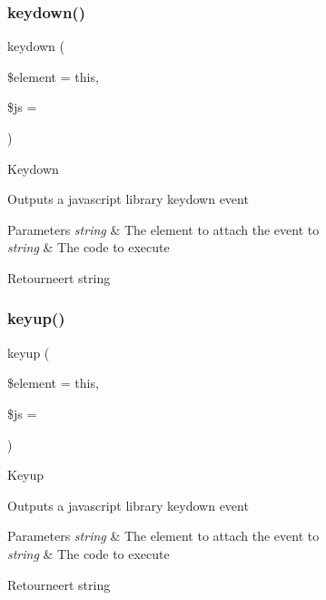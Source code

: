 \subsubsection{\texorpdfstring{keydown()}{keydown()}}
{\footnotesize\ttfamily keydown (\begin{DoxyParamCaption}\item[{}]{\$element = {\ttfamily \textquotesingle{}this\textquotesingle{}},  }\item[{}]{\$js = {\ttfamily \textquotesingle{}\textquotesingle{}} }\end{DoxyParamCaption})}

Keydown

Outputs a javascript library keydown event


\begin{DoxyParams}{Parameters}
{\em string} & The element to attach the event to \\
\hline
{\em string} & The code to execute \\
\hline
\end{DoxyParams}
\begin{DoxyReturn}{Retourneert}
string 
\end{DoxyReturn}
\mbox{\label{class_c_i___javascript_a8c6e3a3b521c059cfd6799b3dc73d0d6}} 
\subsubsection{\texorpdfstring{keyup()}{keyup()}}
{\footnotesize\ttfamily keyup (\begin{DoxyParamCaption}\item[{}]{\$element = {\ttfamily \textquotesingle{}this\textquotesingle{}},  }\item[{}]{\$js = {\ttfamily \textquotesingle{}\textquotesingle{}} }\end{DoxyParamCaption})}

Keyup

Outputs a javascript library keydown event


\begin{DoxyParams}{Parameters}
{\em string} & The element to attach the event to \\
\hline
{\em string} & The code to execute \\
\hline
\end{DoxyParams}
\begin{DoxyReturn}{Retourneert}
string 
\end{DoxyReturn}
\mbox{\label{class_c_i___javascript_a5e0d3ce786a91561730aa9610b811f67}} 
